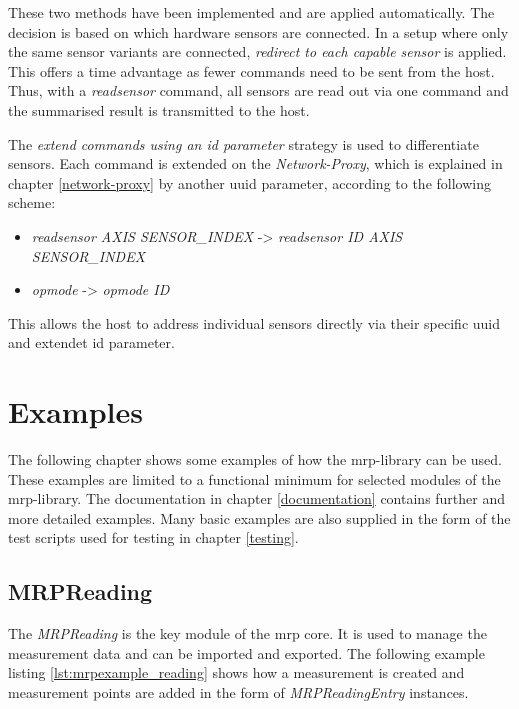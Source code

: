 These two methods have been implemented and are applied automatically.
The decision is based on which hardware sensors are connected. In a
setup where only the same sensor variants are connected, \emph{redirect
to each capable sensor} is applied. This offers a time advantage as
fewer commands need to be sent from the host. Thus, with a
\emph{readsensor} command, all sensors are read out via one command and
the summarised result is transmitted to the host.

The \emph{extend commands using an id parameter} strategy is used to
differentiate sensors. Each command is extended on the
\emph{Network-Proxy}, which is explained in chapter \ref{network-proxy}
by another \gls{uuid} parameter, according to the following scheme:

\begin{itemize}
\tightlist
\item
  \emph{readsensor AXIS SENSOR\_INDEX} -\textgreater{} \emph{readsensor
  ID AXIS SENSOR\_INDEX}
\item
  \emph{opmode} -\textgreater{} \emph{opmode ID}
\end{itemize}

This allows the host to address individual sensors directly via their
specific \gls{uuid} and extendet id parameter.

\hypertarget{examples}{%
\section{Examples}\label{examples}}

The following chapter shows some examples of how the \gls{mrp}-library
can be used. These examples are limited to a functional minimum for
selected modules of the \gls{mrp}-library. The documentation in chapter
\ref{documentation} contains further and more detailed examples. Many
basic examples are also supplied in the form of the test scripts used
for testing in chapter \ref{testing}.

\hypertarget{mrpreading}{%
\subsection{MRPReading}\label{mrpreading}}

The \emph{MRPReading} is the key module of the \gls{mrp} core. It is
used to manage the measurement data and can be imported and exported.
The following example listing \ref{lst:mrpexample_reading} shows how a
measurement is created and measurement points are added in the form of
\emph{MRPReadingEntry} instances.

